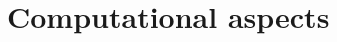 \documentclass[10pt]{beamer}
\begin{document}



\section{Computational aspects}
\frame{\sectionpage}
\end{document}
